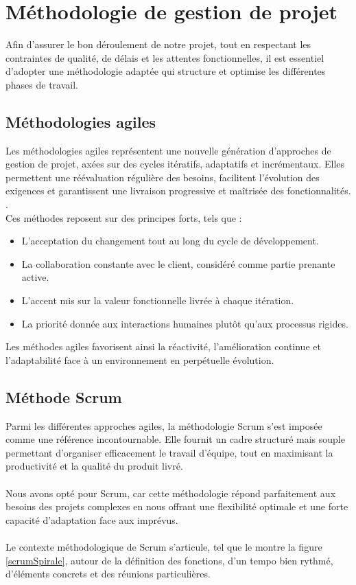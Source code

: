 \section{Méthodologie de gestion de projet}
\normalsize{

Afin d'assurer le bon déroulement de notre projet, tout en respectant les contraintes de qualité, de délais et les attentes fonctionnelles, il est essentiel d’adopter une méthodologie adaptée qui structure et optimise les différentes phases de travail.
\subsection{Méthodologies agiles}
Les méthodologies agiles représentent une nouvelle génération d’approches de gestion de projet, axées sur des cycles itératifs, adaptatifs et incrémentaux. Elles permettent une réévaluation régulière des besoins, facilitent l’évolution des exigences et garantissent une livraison progressive et maîtrisée des fonctionnalités. \cite{ref10}.\\ 
Ces méthodes reposent sur des principes forts, tels que :
\begin{itemize}
    \item L’acceptation du changement tout au long du cycle de développement.
    \item La collaboration constante avec le client, considéré comme partie prenante active.
    \item L’accent mis sur la valeur fonctionnelle livrée à chaque itération.
    \item La priorité donnée aux interactions humaines plutôt qu’aux processus rigides.
\end{itemize}
Les méthodes agiles favorisent ainsi la réactivité, l’amélioration continue et l’adaptabilité face à un environnement en perpétuelle évolution.
\subsection{Méthode Scrum }
Parmi les différentes approches agiles, la méthodologie Scrum s’est imposée comme une référence incontournable. Elle fournit un cadre structuré mais souple permettant d’organiser efficacement le travail d’équipe, tout en maximisant la productivité et la qualité du produit livré.\\
\\
Nous avons opté pour Scrum, car cette méthodologie répond parfaitement aux besoins des projets complexes en nous offrant une flexibilité optimale et une forte capacité d’adaptation face aux imprévus.\\
\\
Le contexte méthodologique de Scrum s'articule, tel que le montre la figure  \ref{scrumSpirale}, autour de la définition des fonctions, d'un tempo bien rythmé, d'éléments concrets et des réunions particulières.
 

}
